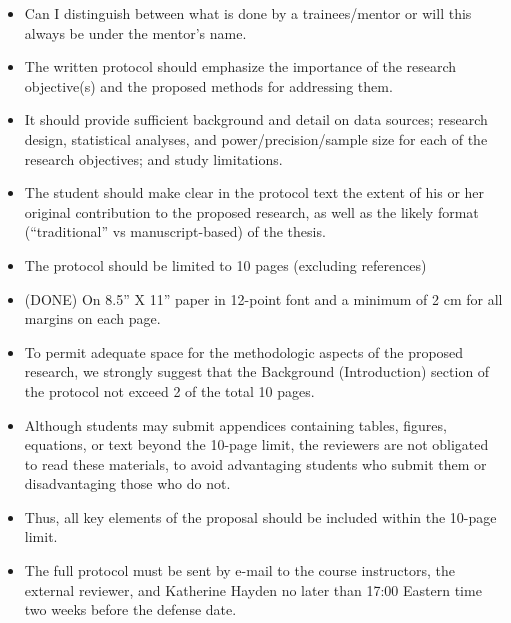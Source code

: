 
\begin{itemize}
    \item Can I distinguish between what is done by a trainees/mentor or will this always be under the mentor's name.
\end{itemize}

\begin{itemize}
    \item The written protocol should emphasize the importance of the research objective(s) and the proposed methods for addressing them.
    \item It should provide sufficient background and detail on data sources; research design, statistical analyses, and power/precision/sample size for each of the research objectives; and study limitations.
    \item The student should make clear in the protocol text the extent of his or her original contribution to the proposed research, as well as the likely format (“traditional” vs manuscript-based) of the thesis.
    \item The protocol should be limited to 10 pages (excluding references)
    \item (DONE) On 8.5” X 11” paper in 12-point font and a minimum of 2 cm for all margins on each page.
    \item To permit adequate space for the methodologic aspects of the proposed research, we strongly suggest that the Background (Introduction) section of the protocol not exceed 2 of the total 10 pages.
    \item Although students may submit appendices containing tables, figures, equations, or text beyond the 10-page limit, the reviewers are not obligated to read these materials, to avoid advantaging students who submit them or disadvantaging those who do not.
    \item Thus, all key elements of the proposal should be included within the 10-page limit.
    \item The full protocol must be sent by e-mail to the course instructors, the external reviewer, and Katherine Hayden no later than 17:00 Eastern time two weeks before the defense date.
\end{itemize}